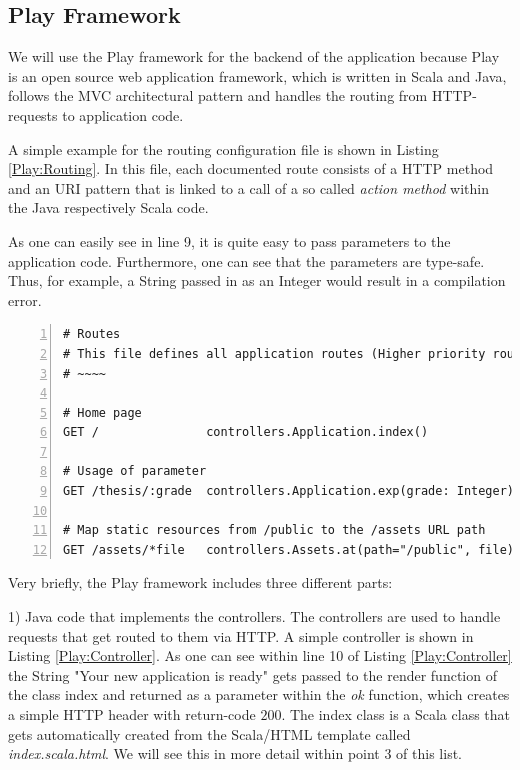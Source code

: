 \subsection{Play Framework}	
\label{Play2}
We will use the Play framework for the backend of the application because Play is an open source web application framework, which is written in Scala and Java, follows the \ac{MVC} architectural pattern and handles the routing from \ac{HTTP}-requests to application code. 

A simple example for the routing configuration file is shown in Listing \ref{Play:Routing}. In this file, each documented route consists of a \ac{HTTP} method and an \ac{URI} pattern that is linked to a call of a so called \textit{action method} within the Java respectively Scala code. 

As one can easily see in line 9, it is quite easy to pass parameters to the application code. Furthermore, one can see that the parameters are type-safe. Thus, for example, a String passed in as an Integer would result in a compilation error. 

\begin{lstlisting}[numbers=left,caption={Simple routing configuration file within the Play Framework.},label=Play:Routing,frame=tlbr,breaklines]
# Routes
# This file defines all application routes (Higher priority routes first)
# ~~~~

# Home page
GET /               controllers.Application.index()

# Usage of parameter
GET /thesis/:grade  controllers.Application.exp(grade: Integer)

# Map static resources from /public to the /assets URL path
GET /assets/*file   controllers.Assets.at(path="/public", file)
\end{lstlisting}

Very briefly, the Play framework includes three different parts: 

1) Java code that implements the controllers. The controllers are used to handle requests that get routed to them via \ac{HTTP}. A simple controller is shown in Listing \ref{Play:Controller}. As one can see within line 10 of Listing \ref{Play:Controller} the String "Your new application is ready" gets passed to the render function of the class index and returned as a parameter within the \textit{ok} function, which creates a simple \ac{HTTP} header with return-code $200$. The index class is a Scala class that gets automatically created from the Scala/\acs{HTML} template called \textit{index.scala.html}. We will see this in more detail within point 3 of this list.

